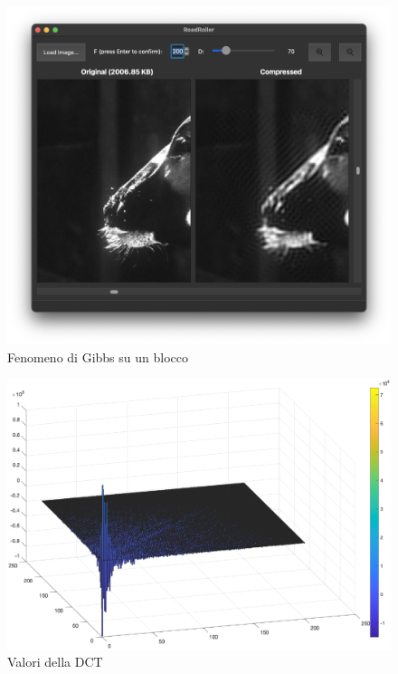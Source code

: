 \begin{figure}[h]
	\centering
	\includegraphics[width=1\linewidth]{figures/gibbs_phenomenon}
	\caption{Fenomeno di Gibbs su un blocco}
	\label{fig:gibbs}
\end{figure}

\begin{figure}[h]
	\centering
	\includegraphics[width=1\linewidth]{figures/dct_values_3d.eps}
	\caption{Valori della DCT}
	\label{fig:dct_values_on_gibbs}
\end{figure}
